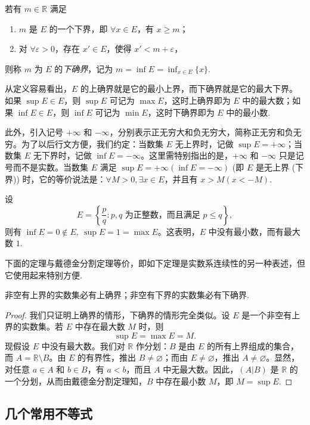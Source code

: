 若有 $m\in\mathbb{R}$ 满足
\begin{enumerate}
  \item $m$ 是 $E$ 的一个下界，即 $\forall x\in E$，有 $x\geqslant m$；
  \item 对 $\forall\varepsilon>0$，存在 $x'\in E$，使得 $x'<m+\varepsilon$，
\end{enumerate}
则称 $m$ 为 $E$ 的\emph{下确界}，记为 $m=\inf E=\inf_{x\in E}\{x\}$.

从定义容易看出，$E$ 的上确界就是它的最小上界，而下确界就是它的最大下界。如果 $\sup E\in E$，则 $\sup E$ 可记为 $\max E$，这时上确界即为 $E$ 中的最大数；如果 $\inf E\in E$，则 $\inf E$ 可记为 $\min E$，这时下确界即为 $E$ 中的最小数.

此外，引入记号 $+\infty$ 和 $-\infty$，分别表示正无穷大和负无穷大，简称正无穷和负无穷。为了以后行文方便，我们约定：当数集 $E$ 无上界时，记做 $\sup E=+\infty$；当数集 $E$ 无下界时，记做 $\inf E=-\infty$。这里需特别指出的是，$+\infty$ 和 $-\infty$ 只是记号而不是实数。当数集 $E$ 满足 $\sup E=+\infty(\inf E=-\infty)$ (即 $E$ 是无上界 (下界)) 时，它的等价说法是：$\forall M>0,\exists x\in E$，并且有 $x>M(x<-M)$.

\begin{example}\label{example:ma-1-1-4}
设
\[
  E=\left\{\frac pq:p,q\text{ 为正整数，而且满足 }p\leqslant q\right\},
\]
则有 $\inf E=0\notin E,\ \sup E=1=\max E$。这表明，$E$ 中没有最小数，而有最大数 $1$.
\end{example}

下面的定理与戴德金分割定理等价，即如下定理是实数系连续性的另一种表述，但它使用起来特别方便.

\begin{theorem}[{确界存在定理}]\label{theorem:ma-1-1-2}
非空有上界的实数集必有上确界；非空有下界的实数集必有下确界.
\end{theorem}


\begin{proof}
我们只证明上确界的情形，下确界的情形完全类似。设 $E$ 是一个非空有上界的实数集。若 $E$ 中存在最大数 $M$ 时，则
\[
  \sup E=\max E=M.
\]
现假设 $E$ 中没有最大数。我们对 $\mathbb{R}$ 作分划：$B$ 是由 $E$ 的所有上界组成的集合，而 $A=\mathbb{R}\setminus B$。由 $E$ 的有界性，推出 $B\ne\varnothing$；而由 $E\ne\varnothing$，推出 $A\ne\varnothing$。显然，对任意 $a\in A$ 和 $b\in B$，有 $a<b$，而且 $A$ 中无最大数。因此，$(A|B)$ 是 $\mathbb{R}$ 的一个分划，从而由戴德金分割定理知，$B$ 中存在最小数 $M$，即 $M=\sup E$.
\end{proof}


\subsection{几个常用不等式}
\label{subsec:ma-1-1-4}

